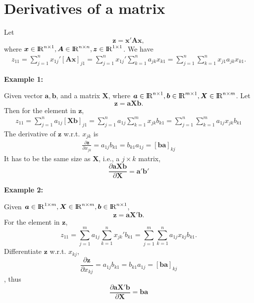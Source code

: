 \documentclass[10pt]{article}
\begin{document}
\section{Derivatives of a matrix}
Let 
\begin{equation*}
\bm{z} = \bm{x}'\bm{Ax},
\end{equation*}
where $ \bm{x} \in {\rm I\!{R}}^{n  \times 1}, \bm{A} \in {\rm I\!{R}}^{n  \times n},
\bm{z} \in {\rm I\!{R}}^{1  \times 1}$.
We have
\begin{align*}
		z_{11} = \sum\limits_{j = 1} ^n x_{1j}'[\bm{Ax}]_{j1}
		=\sum\limits_{j = 1} ^n x_{1j}'\sum\limits_{k = 1} ^n a_{jk}x_{k1}	
		=\sum\limits_{j = 1} ^n \sum\limits_{k = 1} ^n x_{j 1}a_{jk}x_{k 1}		.
\end{align*}

{\textbf {Example 1:}}

Given vector $ \bm{a}, \bm{b} $, and a matrix $ \bm{X} $, where
$ \bm{a} \in {\rm I\!{R}}^{n  \times 1}, \bm{b} \in {\rm I\!{R}}^{m  \times 1}, 
\bm{X} \in {\rm I\!{R}}^{n  \times m}$.
Let 
\begin{equation*}
\bm{z} = \bm{aXb}.
\end{equation*}
Then for the element in $ \bm{z} $,
\begin{align*}
		z_{11} = \sum\limits_{j = 1} ^n a_{1j}[\bm{Xb}]_{j1}
		=\sum\limits_{j = 1} ^n a_{1j}\sum\limits_{k = 1} ^	m x_{jk} b_{k 1}
		=\sum\limits_{j = 1} ^n \sum\limits_{k = 1} ^m a_{1 j}x_{jk}b_{k 1}		
\end{align*}
The derivative of $ \bm{z} $ w.r.t. $ x_{jk} $ is
\begin{align*}
		\frac{\partial \bm{z} }{\partial x_{jk} } = a_{1j}b_{k 1} = b_{k 1}a_{1j} = 
		[\bm{ba}]_{kj}
\end{align*}
It has to be the same size as $ \bm{X} $, i.e., a $ j  \times k $ matrix,
\begin{equation}
\frac{\partial \bm{aXb} }{\partial \bm{X} }=\bm{a}'\bm{b}' \label{eqn:AXB}
\end{equation}


{\textbf {Example 2:}}

Given $ \bm{a}\in {\rm I\!{R}}^{1  \times m}, \bm{X} \in {\rm I\!{R}}^{n  \times m},
\bm{b} \in {\rm I\!{R}}^{n  \times 1}$,
\begin{equation*}
\bm{z} = \bm{aX}'\bm{b}.
\end{equation*}
For the element in $ \bm{z} $,
\begin{equation*}
z_{11} = \sum\limits_{j = 1} ^m a_{1j} \sum\limits_{k = 1} ^n x_{jk}'b_{k 1}
=\sum\limits_{j = 1} ^m \sum\limits_{k = 1} ^n	a_{1j}x_{kj}b_{k  1}.
\end{equation*}
Differentiate $ \bm{z} $ w.r.t. $ x_{kj} $,
\begin{equation*}
		\frac{\partial \bm{z} }{\partial x_{kj} }=a_{1j}b_{k1} = b_{k 1}a_{1j}=[\bm{ba}]_{kj}
\end{equation*}
,
thus
\begin{equation}
\frac{\partial \bm{aX}'\bm{b} }{\partial \bm{X} } = \bm{ba} \label{eqn:ax'b}
\end{equation}
\end{document}
